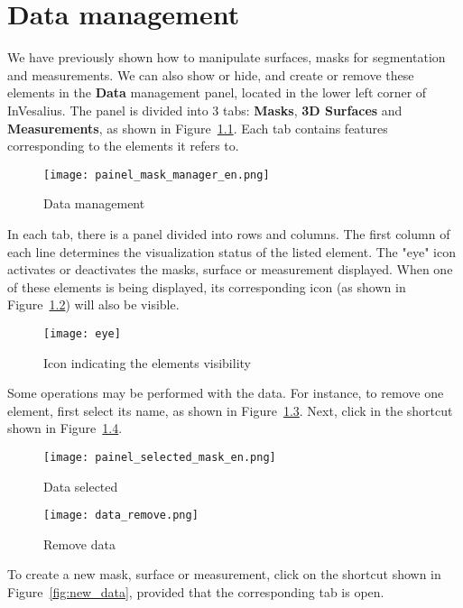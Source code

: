 \chapter{Data management}

We have previously shown how to manipulate surfaces, masks for segmentation and measurements. We can also show or hide, and create or remove these elements in the \textbf{Data} management panel, located in the lower left corner of InVesalius. The panel is divided into 3 tabs: \textbf{Masks}, \textbf{3D Surfaces} and \textbf{Measurements}, as shown in Figure~\ref{fig:volumetric_data}. Each tab contains features corresponding to the elements it refers to.

\begin{figure}[!htb]
\centering
\texttt{[image: painel\_mask\_manager\_en.png]}
\caption{Data management}
\label{fig:volumetric_data}
\end{figure}

In each tab, there is a panel divided into rows and columns. The first column of each line determines the visualization status of the listed element. The "eye" icon activates or deactivates the masks, surface or measurement displayed. When one of these elements is being displayed, its corresponding icon (as shown in Figure~\ref{fig:disable_mask}) will also be visible.

\newpage

\begin{figure}[!htb]
\centering
\texttt{[image: eye]}
\caption{Icon indicating the elements visibility}
\label{fig:disable_mask}
\end{figure}

Some operations may be performed with the data. For instance, to remove one element, first select its name, as shown in Figure~\ref{fig:selected_mask}. Next, click in the shortcut shown in Figure~\ref{fig:delete_data}.

\begin{figure}[!htb]
\centering
\texttt{[image: painel\_selected\_mask\_en.png]}
\caption{Data selected}
\label{fig:selected_mask}
\end{figure}


\begin{figure}[!htb]
\centering
\texttt{[image: data\_remove.png]}
\caption{Remove data}
\label{fig:delete_data}
\end{figure}

To create a new mask, surface or measurement, click on the shortcut shown in Figure~\ref{fig:new_data}, provided that the corresponding tab is open.

